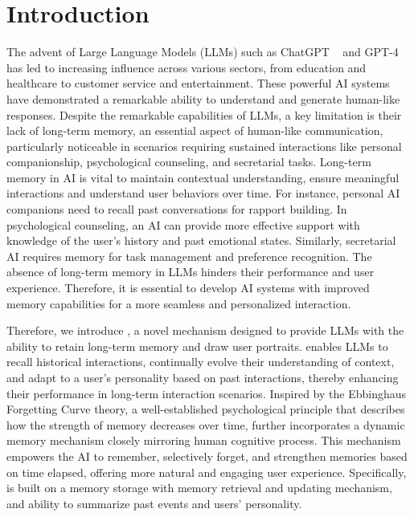 \saveSpaceSec
\section{Introduction}
\saveSpaceSec
The advent of Large Language Models (LLMs) such as ChatGPT%
~\citep{chatgpt} and GPT-4~\citep{openai2023gpt4} has led to increasing influence across various sectors, from education and healthcare to customer service and entertainment. 
These powerful AI systems have demonstrated a remarkable ability to understand and generate human-like responses. Despite the remarkable capabilities of LLMs, a key limitation is their lack of long-term memory, an essential aspect of human-like communication, particularly noticeable in scenarios requiring sustained interactions like personal companionship, psychological counseling, and secretarial tasks.
Long-term memory in AI is vital to maintain contextual understanding, ensure meaningful interactions and understand user behaviors over time. For instance, personal AI companions need to recall past conversations for rapport building. In psychological counseling, an AI can provide more effective support with knowledge of the user's history and past emotional states. Similarly, secretarial AI requires memory for task management and preference recognition. The absence of long-term memory in LLMs hinders their performance and user experience. Therefore, it is essential to develop AI systems with improved memory capabilities for a more seamless and personalized interaction.

Therefore, we introduce \method, a novel mechanism designed to provide LLMs with the ability to retain long-term memory and draw user portraits. \method enables LLMs to recall historical interactions, continually evolve their understanding of context, and adapt to a user's personality based on past interactions, thereby enhancing their performance in long-term interaction scenarios.
Inspired by the Ebbinghaus Forgetting Curve theory, a well-established psychological principle that describes how the strength of memory decreases over time, \method further incorporates a dynamic memory mechanism closely mirroring human cognitive process. This mechanism empowers the AI to remember, selectively forget, and strengthen memories based on time elapsed, offering more natural and engaging user experience. 
Specifically, \method is built on a memory storage with memory retrieval and updating mechanism, and ability to summarize past events and users' personality.

